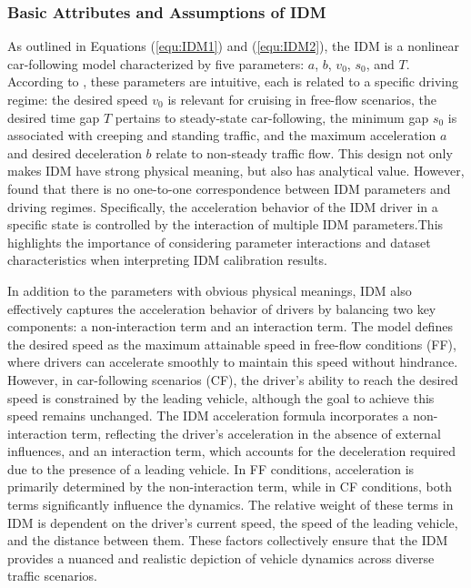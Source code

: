 \documentclass[a4paper,fleqn]{cas-sc}
\begin{document}
\subsubsection{Basic Attributes and Assumptions of IDM}

As outlined in Equations (\ref{equ:IDM1}) and (\ref{equ:IDM2}), the IDM is a nonlinear car-following model characterized by five parameters: $a$, $b$, $v_0$, $s_0$, and $T$. According to \cite{treiberMicroscopicCalibrationValidationCarFollowing2013}, these parameters are intuitive, each is related to a specific driving regime: the desired speed $v_0$ is relevant for cruising in free-flow scenarios, the desired time gap $T$ pertains to steady-state car-following, the minimum gap $s_0$ is associated with creeping and standing traffic, and the maximum acceleration $a$ and desired deceleration $b$ relate to non-steady traffic flow. This design not only makes IDM have strong physical meaning, but also has analytical value. However,  \cite{sharmaMoreAlwaysBetterImpact2019b} found that there is no one-to-one correspondence between IDM parameters and driving regimes. Specifically, the acceleration behavior of the IDM driver in a specific state is controlled by the interaction of multiple IDM parameters.This highlights the importance of considering parameter interactions and dataset characteristics when interpreting IDM calibration results.

In addition to the parameters with obvious physical meanings, IDM also effectively captures the acceleration behavior of drivers by balancing two key components: a non-interaction term and an interaction term. The model defines the desired speed as the maximum attainable speed in free-flow conditions (FF), where drivers can accelerate smoothly to maintain this speed without hindrance. However, in car-following scenarios (CF), the driver's ability to reach the desired speed is constrained by the leading vehicle, although the goal to achieve this speed remains unchanged. The IDM acceleration formula incorporates a non-interaction term, reflecting the driver's acceleration in the absence of external influences, and an interaction term, which accounts for the deceleration required due to the presence of a leading vehicle. In FF conditions, acceleration is primarily determined by the non-interaction term, while in CF conditions, both terms significantly influence the dynamics. The relative weight of these terms in IDM is dependent on the driver's current speed, the speed of the leading vehicle, and the distance between them. These factors collectively ensure that the IDM provides a nuanced and realistic depiction of vehicle dynamics across diverse traffic scenarios.
\end{document}
